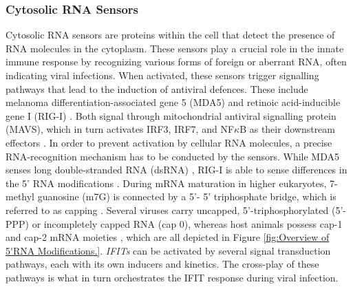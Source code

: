 \subsubsection{Cytosolic RNA Sensors} \label{Cytosolic Nuclec Acid Sensors}
Cytosolic RNA sensors are proteins within the cell that detect the presence of RNA molecules in the cytoplasm. These sensors play a crucial role in the innate immune response by recognizing various forms of foreign or aberrant RNA, often indicating viral infections. When activated, these sensors trigger signalling pathways that lead to the induction of antiviral defences. These include melanoma differentiation-associated gene 5 (MDA5) and retinoic acid-inducible gene I (RIG-I) \cite{Vladimer2014IFITs:Proteins}. Both signal through mitochondrial antiviral signalling protein (MAVS), which in turn activates IRF3, IRF7, and NF\(\kappa\)B as their downstream effectors \cite{Ashley2019Interferon-IndependentCytomegalovirus}. In order to prevent activation by cellular RNA molecules, a precise RNA-recognition mechanism has to be conducted by the sensors. While MDA5 senses long double-stranded RNA (dsRNA) \cite{Brisse2019ComparativeMDA5}, RIG-I is able to sense differences in the 5' RNA modifications \cite{Schlee2016DiscriminatingSensing}. During mRNA maturation in higher eukaryotes, 7-methyl guanosine (m7G) is connected by a 5'- 5' triphosphate bridge, which is referred to as capping \cite{Devarkar2016StructuralRIG-I, Ramanathan2016MRNAApplications}. Several viruses carry uncapped, 5'-triphosphorylated (5'-PPP) or incompletely capped RNA (cap 0), whereas host animals possess cap-1 and cap-2 mRNA moieties \cite{Choi2018ACaps}, which are all depicted in Figure \ref{fig:Overview of 5'RNA Modifications.}. \textit{IFITs} can be activated by several signal transduction pathways, each with its own inducers and kinetics. The cross-play of these pathways is what in turn orchestrates the IFIT response during viral infection.

